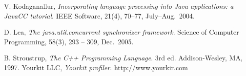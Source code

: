 \documentclass[preprint]{sigplanconf}
\begin{document}
\begin{thebibliography}{}
    V. Kodaganallur, \emph{Incorporating language processing into Java 
    applications: a JavaCC tutorial}. IEEE Software, 21(4), 70--77,
    July--Aug.~2004. 

    D. Lea, \emph{The java.util.concurrent synchronizer framework}. Science of 
    Computer Programming, 58(3), 293 -- 309, Dec.~2005.

    B. Stroustrup, \emph{The C++ Programming Language}. 3rd ed. Addison-Wesley,
    MA, 1997.
    Yourkit LLC, \emph{Yourkit profiler}. http://www.yourkir.com

\end{thebibliography}
\end{document}
